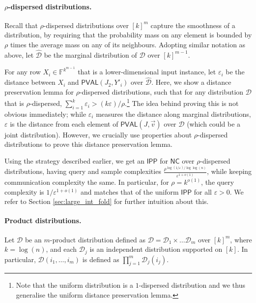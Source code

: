 \documentclass[10pt,a4paper]{article}
\newcommand{\NC}{\mathsf{NC}}
\newcommand{\PVAL}{\mathsf{PVAL}}
\newcommand{\IPP}{\mathsf{IPP}}
\newcommand{\F}{\mathbb{F}}
\newcommand{\sD}{\mathcal{D}}
\newcommand{\eps}{\varepsilon}
\begin{document}
\paragraph{$\rho$-dispersed distributions.} Recall that $\rho$-dispersed distributions over $[k]^m$ capture the smoothness of a distribution, by 
requiring that the probability mass on any element is bounded by $\rho$ times the average mass on any of its neighbours. Adopting similar notation as above, let $\hat{\sD}$ be the marginal distribution of $\sD$ over $[k]^{m-1}$.

For any row $X_i \in \F^{k^{m-1}}$ that is a lower-dimensional input instance, let $\varepsilon_i$ be the distance between $X_i$ and $\PVAL(J_2, Y'_i)$ over $\hat{\sD}$. Here, we show a distance preservation lemma for $\rho$-dispersed distributions, such that for any distribution $\sD$ that is $\rho$-dispersed, $\sum_{i=1}^k \varepsilon_i > (k\varepsilon)/\rho$.\footnote{Note that the uniform distribution is a $1$-dispersed distribution and we thus generalise the uniform distance preservation lemma.} The idea behind proving this is not obvious immediately; while $\varepsilon_i$ measures the distance along marginal distributions, $\eps$ is the distance from each element of $\PVAL(J,\vec{v})$ over $\sD$ (which could be a joint distribution). However, we crucially use properties about $\rho$-dispersed distributions to prove this distance preservation lemma. 

Using the strategy described earlier, we get an $\IPP$ for $\NC$ over $\rho$-dispersed distributions, having query and sample complexities $\frac{\rho^{\log (1/\varepsilon)/\log\log (n)}}{\varepsilon ^{1+o(1)}}$, while keeping communication complexity the same. In particular, for $\rho = k^{o(1)}$, the query complexity is $1/\varepsilon^{1+o(1)}$ and matches that of the uniform $\IPP$ for all $\varepsilon > 0$. We refer to Section \ref{sec:large_int_fold} for further intuition about this.

\paragraph*{Product distributions.} Let $\sD$ be an $m$-product distribution defined as $\sD = \sD_1 \times \dots \sD_m$ over $[k]^m$, where $k = \log(n)$, and each $\sD_j$ is an independent distribution supported on $[k]$. In particular, $\sD(i_1, \dots, i_m)$ is defined as $\prod_{j=1}^m \sD_j(i_j)$. 
\end{document}
